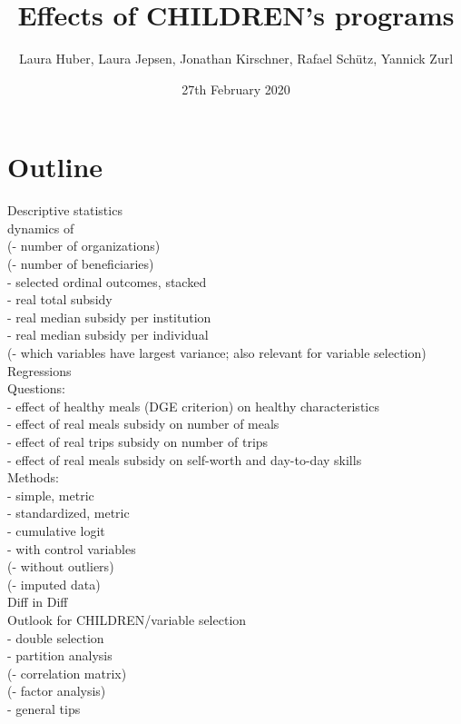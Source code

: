\documentclass[12pt, a4paper]{article}\usepackage[]{graphicx}\usepackage[]{color}
\title{Effects of CHILDREN's programs}
\author{Laura Huber, Laura Jepsen, Jonathan Kirschner, Rafael Schütz, Yannick Zurl}
\date{27th February 2020}
\begin{document}
\begin{titlepage}
\maketitle
\end{titlepage}

\tableofcontents
\listoftables
\listoffigures

\section{Outline}
Descriptive statistics\\
dynamics of\\ 
(- number of organizations)\\
(- number of beneficiaries)\\
- selected ordinal outcomes, stacked\\
- real total subsidy\\
- real median subsidy per institution\\
- real median subsidy per individual\\
(- which variables have largest variance; also relevant for variable selection)\\

Regressions\\

Questions:\\
- effect of healthy meals (DGE criterion) on healthy characteristics\\
- effect of real meals subsidy on number of meals\\
- effect of real trips subsidy on number of trips\\
- effect of real meals subsidy on self-worth and day-to-day skills\\

Methods:\\
- simple, metric\\
- standardized, metric\\
- cumulative logit\\
- with control variables\\
(- without outliers)\\
(- imputed data)\\

Diff in Diff\\

Outlook for CHILDREN/variable selection\\
- double selection \\
- partition analysis\\
(- correlation matrix)\\
(- factor analysis)\\
- general tips\\
\end{document}
